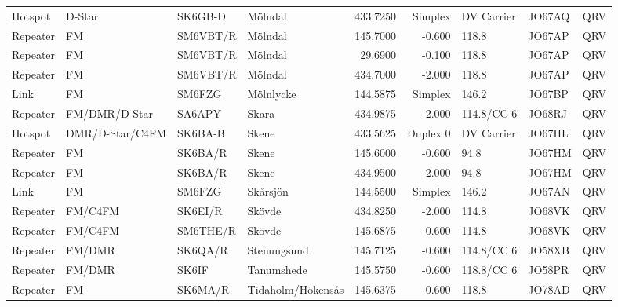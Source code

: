 \begin{landscape}
\begin{longtable}{llllrrlll}
	Hotspot  & D-Star          & SK6GB-D  & Mölndal               &     433.7250 &    Simplex & DV Carrier        & JO67AQ      & QRV      \\
	Repeater & FM              & SM6VBT/R & Mölndal               &     145.7000 &     -0.600 & 118.8             & JO67AP      & QRV      \\
	Repeater & FM              & SM6VBT/R & Mölndal               &      29.6900 &     -0.100 & 118.8             & JO67AP      & QRV      \\
	Repeater & FM              & SM6VBT/R & Mölndal               &     434.7000 &     -2.000 & 118.8             & JO67AP      & QRV      \\
	Link     & FM              & SM6FZG   & Mölnlycke             &     144.5875 &    Simplex & 146.2             & JO67BP      & QRV      \\
	Repeater & FM/DMR/D-Star   & SA6APY   & Skara                 &     434.9875 &     -2.000 & 114.8/CC 6        & JO68RJ      & QRV      \\
	Hotspot  & DMR/D-Star/C4FM & SK6BA-B  & Skene                 &     433.5625 &   Duplex 0 & DV Carrier        & JO67HL      & QRV      \\
	Repeater & FM              & SK6BA/R  & Skene                 &     145.6000 &     -0.600 & 94.8              & JO67HM      & QRV      \\
	Repeater & FM              & SK6BA/R  & Skene                 &     434.9500 &     -2.000 & 94.8              & JO67HM      & QRV      \\
	Link     & FM              & SM6FZG   & Skårsjön              &     144.5500 &    Simplex & 146.2             & JO67AN      & QRV      \\
	Repeater & FM/C4FM         & SK6EI/R  & Skövde                &     434.8250 &     -2.000 & 114.8             & JO68VK      & QRV      \\
	Repeater & FM/C4FM         & SM6THE/R & Skövde                &     145.6875 &     -0.600 & 114.8             & JO68VK      & QRV      \\
	Repeater & FM/DMR          & SK6QA/R  & Stenungsund           &     145.7125 &     -0.600 & 114.8/CC 6        & JO58XB      & QRV      \\
	Repeater & FM/DMR          & SK6IF    & Tanumshede            &     145.5750 &     -0.600 & 118.8/CC 6        & JO58PR      & QRV      \\
	Repeater & FM              & SK6MA/R  & Tidaholm/Hökensås     &     145.6375 &     -0.600 & 118.8             & JO78AD      & QRV      \\

\end{longtable}
\end{landscape}
